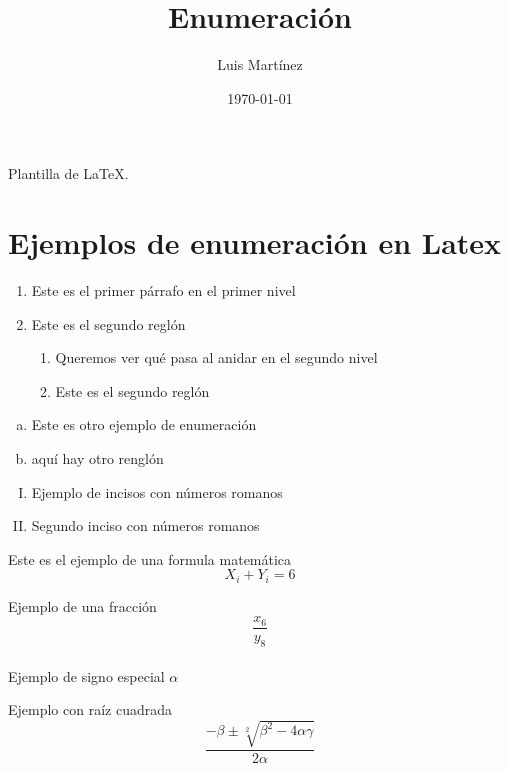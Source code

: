 \documentclass{article}
\author{Luis Martínez}
\title{Enumeración}
\date{\today}
\begin{document}
\maketitle

Plantilla de \LaTeX.

\section{Ejemplos de enumeración en Latex}
\begin{enumerate}
\item Este es el primer párrafo en el primer nivel
\item Este es el segundo reglón
  \begin{enumerate}
  \item Queremos ver qué pasa al anidar en el segundo nivel
  \item Este es el segundo reglón
  \end{enumerate}
\end{enumerate}

\begin{enumerate}[(a)]
\item Este es otro ejemplo de enumeración
\item aquí hay otro renglón
\end{enumerate}

\begin{enumerate}[I.]
\item Ejemplo de incisos con números romanos
	\item Segundo inciso con números romanos
\end{enumerate}

Este es el ejemplo de una formula matemática
$$ X_i + Y_i = 6 $$

Ejemplo de una fracción 
$$\frac{x_6}{y_8}$$\\


Ejemplo de signo especial $\alpha$ 

Ejemplo con raíz cuadrada $$\frac{-\beta \pm \sqrt[2]{\beta^2-4\alpha\gamma}}{2\alpha}$$
\end{document}
